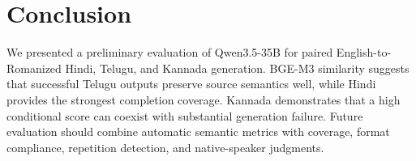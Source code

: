 \section{Conclusion}

We presented a preliminary evaluation of Qwen3.5-35B for paired
English-to-Romanized Hindi, Telugu, and Kannada generation. BGE-M3 similarity
suggests that successful Telugu outputs preserve source semantics well, while
Hindi provides the strongest completion coverage. Kannada demonstrates that a
high conditional score can coexist with substantial generation failure.
Future evaluation should combine automatic semantic metrics with coverage,
format compliance, repetition detection, and native-speaker judgments.
